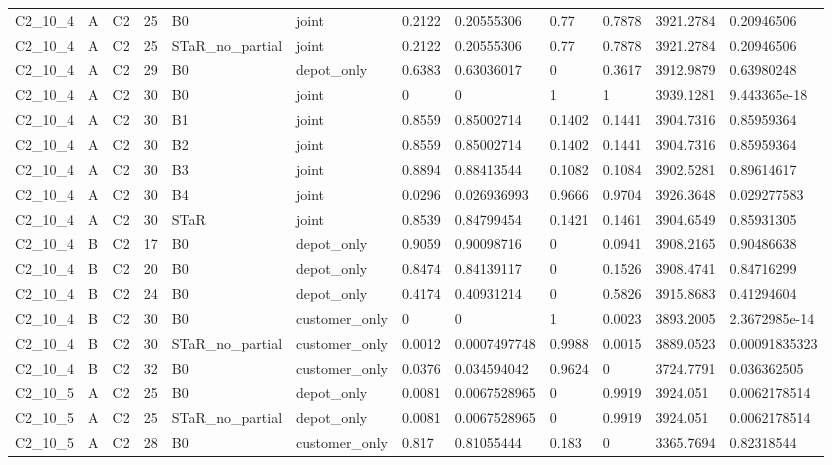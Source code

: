 \begin{longtable}{llllllllllll}
C2\_10\_4 & A & C2 & 25 & B0 & joint & 0.2122 & 0.20555306 & 0.77 & 0.7878 & 3921.2784 & 0.20946506 \\
C2\_10\_4 & A & C2 & 25 & STaR\_no\_partial & joint & 0.2122 & 0.20555306 & 0.77 & 0.7878 & 3921.2784 & 0.20946506 \\
C2\_10\_4 & A & C2 & 29 & B0 & depot\_only & 0.6383 & 0.63036017 & 0 & 0.3617 & 3912.9879 & 0.63980248 \\
C2\_10\_4 & A & C2 & 30 & B0 & joint & 0 & 0 & 1 & 1 & 3939.1281 & 9.443365e-18 \\
C2\_10\_4 & A & C2 & 30 & B1 & joint & 0.8559 & 0.85002714 & 0.1402 & 0.1441 & 3904.7316 & 0.85959364 \\
C2\_10\_4 & A & C2 & 30 & B2 & joint & 0.8559 & 0.85002714 & 0.1402 & 0.1441 & 3904.7316 & 0.85959364 \\
C2\_10\_4 & A & C2 & 30 & B3 & joint & 0.8894 & 0.88413544 & 0.1082 & 0.1084 & 3902.5281 & 0.89614617 \\
C2\_10\_4 & A & C2 & 30 & B4 & joint & 0.0296 & 0.026936993 & 0.9666 & 0.9704 & 3926.3648 & 0.029277583 \\
C2\_10\_4 & A & C2 & 30 & STaR & joint & 0.8539 & 0.84799454 & 0.1421 & 0.1461 & 3904.6549 & 0.85931305 \\
C2\_10\_4 & B & C2 & 17 & B0 & depot\_only & 0.9059 & 0.90098716 & 0 & 0.0941 & 3908.2165 & 0.90486638 \\
C2\_10\_4 & B & C2 & 20 & B0 & depot\_only & 0.8474 & 0.84139117 & 0 & 0.1526 & 3908.4741 & 0.84716299 \\
C2\_10\_4 & B & C2 & 24 & B0 & depot\_only & 0.4174 & 0.40931214 & 0 & 0.5826 & 3915.8683 & 0.41294604 \\
C2\_10\_4 & B & C2 & 30 & B0 & customer\_only & 0 & 0 & 1 & 0.0023 & 3893.2005 & 2.3672985e-14 \\
C2\_10\_4 & B & C2 & 30 & STaR\_no\_partial & customer\_only & 0.0012 & 0.0007497748 & 0.9988 & 0.0015 & 3889.0523 & 0.00091835323 \\
C2\_10\_4 & B & C2 & 32 & B0 & customer\_only & 0.0376 & 0.034594042 & 0.9624 & 0 & 3724.7791 & 0.036362505 \\
C2\_10\_5 & A & C2 & 25 & B0 & depot\_only & 0.0081 & 0.0067528965 & 0 & 0.9919 & 3924.051 & 0.0062178514 \\
C2\_10\_5 & A & C2 & 25 & STaR\_no\_partial & depot\_only & 0.0081 & 0.0067528965 & 0 & 0.9919 & 3924.051 & 0.0062178514 \\
C2\_10\_5 & A & C2 & 28 & B0 & customer\_only & 0.817 & 0.81055444 & 0.183 & 0 & 3365.7694 & 0.82318544 \\

\end{longtable}
